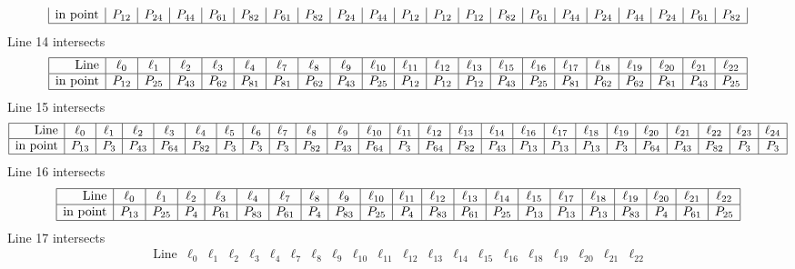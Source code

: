 \documentclass{article}
\begin{document}
{$$\begin{array}{|r*{20}{|c}|}
\mbox{in point}  & P_{12} & P_{24} & P_{44} & P_{61} & P_{82} & P_{61} & P_{82} & P_{24} & P_{44} & P_{12} & P_{12} & P_{12} & P_{82} & P_{61} & P_{44} & P_{24} & P_{44} & P_{24} & P_{61} & P_{82}\\
\hline
\end{array}
$$
Line 14 intersects 
$$
\begin{array}{|r*{20}{|c}|}
\hline
\mbox{Line}  & \ell_{0} & \ell_{1} & \ell_{2} & \ell_{3} & \ell_{4} & \ell_{7} & \ell_{8} & \ell_{9} & \ell_{10} & \ell_{11} & \ell_{12} & \ell_{13} & \ell_{15} & \ell_{16} & \ell_{17} & \ell_{18} & \ell_{19} & \ell_{20} & \ell_{21} & \ell_{22}\\
\hline
\mbox{in point}  & P_{12} & P_{25} & P_{43} & P_{62} & P_{81} & P_{81} & P_{62} & P_{43} & P_{25} & P_{12} & P_{12} & P_{12} & P_{43} & P_{25} & P_{81} & P_{62} & P_{62} & P_{81} & P_{43} & P_{25}\\
\hline
\end{array}
$$
Line 15 intersects 
$$
\begin{array}{|r*{24}{|c}|}
\hline
\mbox{Line}  & \ell_{0} & \ell_{1} & \ell_{2} & \ell_{3} & \ell_{4} & \ell_{5} & \ell_{6} & \ell_{7} & \ell_{8} & \ell_{9} & \ell_{10} & \ell_{11} & \ell_{12} & \ell_{13} & \ell_{14} & \ell_{16} & \ell_{17} & \ell_{18} & \ell_{19} & \ell_{20} & \ell_{21} & \ell_{22} & \ell_{23} & \ell_{24}\\
\hline
\mbox{in point}  & P_{13} & P_{3} & P_{43} & P_{64} & P_{82} & P_{3} & P_{3} & P_{3} & P_{82} & P_{43} & P_{64} & P_{3} & P_{64} & P_{82} & P_{43} & P_{13} & P_{13} & P_{13} & P_{3} & P_{64} & P_{43} & P_{82} & P_{3} & P_{3}\\
\hline
\end{array}
$$
Line 16 intersects 
$$
\begin{array}{|r*{20}{|c}|}
\hline
\mbox{Line}  & \ell_{0} & \ell_{1} & \ell_{2} & \ell_{3} & \ell_{4} & \ell_{7} & \ell_{8} & \ell_{9} & \ell_{10} & \ell_{11} & \ell_{12} & \ell_{13} & \ell_{14} & \ell_{15} & \ell_{17} & \ell_{18} & \ell_{19} & \ell_{20} & \ell_{21} & \ell_{22}\\
\hline
\mbox{in point}  & P_{13} & P_{25} & P_{4} & P_{61} & P_{83} & P_{61} & P_{4} & P_{83} & P_{25} & P_{4} & P_{83} & P_{61} & P_{25} & P_{13} & P_{13} & P_{13} & P_{83} & P_{4} & P_{61} & P_{25}\\
\hline
\end{array}
$$
Line 17 intersects 
$$
\begin{array}{|r*{20}{|c}|}
\hline
\mbox{Line}  & \ell_{0} & \ell_{1} & \ell_{2} & \ell_{3} & \ell_{4} & \ell_{7} & \ell_{8} & \ell_{9} & \ell_{10} & \ell_{11} & \ell_{12} & \ell_{13} & \ell_{14} & \ell_{15} & \ell_{16} & \ell_{18} & \ell_{19} & \ell_{20} & \ell_{21} & \ell_{22}\\

\end{array}$$}
\end{document}
